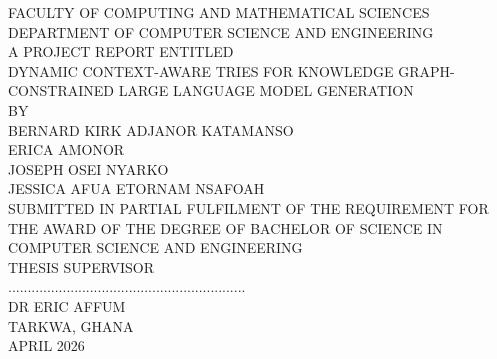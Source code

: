 \documentclass[12pt, onehalfspacing, liststotoc, oneside, parskip, headsepline]{UMaT_Undergrauate_Report_Template_Configurations} %
\author{Your Full Name} %
\begin{document}
\frontmatter %

\pagestyle{plain} %


\begin{titlepage}
  \large
  \begin{center}

    {\scshape \univname\par}\vspace{0cm} %

    { FACULTY OF  COMPUTING AND MATHEMATICAL SCIENCES}\\[0.02cm] %

    {  DEPARTMENT OF COMPUTER SCIENCE AND ENGINEERING }\\[0.8cm] %

    \vspace{0.2cm}
    {  A PROJECT REPORT ENTITLED }\\[0.1cm] %
    {  DYNAMIC CONTEXT-AWARE TRIES FOR KNOWLEDGE GRAPH-CONSTRAINED LARGE LANGUAGE MODEL GENERATION}\\[1cm] %

    {  BY}\\
    { BERNARD KIRK ADJANOR KATAMANSO}\\
    { ERICA AMONOR}\\
    { JOSEPH OSEI NYARKO}\\
    { JESSICA AFUA ETORNAM NSAFOAH}\\[1.2cm] %

    {  SUBMITTED IN PARTIAL FULFILMENT OF THE REQUIREMENT FOR THE AWARD OF THE DEGREE OF BACHELOR OF SCIENCE IN COMPUTER SCIENCE AND ENGINEERING }\\[1.2cm] %

    {  THESIS SUPERVISOR}\\[0.3cm] %

    .............................................................\\

    {  DR ERIC AFFUM}\\[0.6cm]
    {  TARKWA, GHANA\\ APRIL 2026}\\%

  \end{center}
\end{titlepage}
\end{document}
